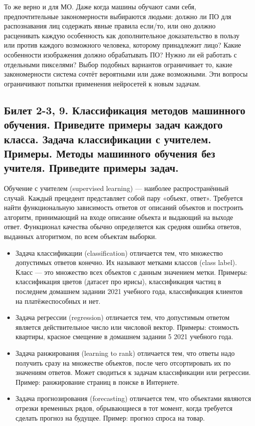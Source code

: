 \documentclass[a4paper, 12pt]{article}
\begin{document}
	То же верно и для МО. Даже когда машины обучают сами себя, предпочтительные закономерности выбираются людьми: должно ли ПО для распознавания лиц содержать явные правила если/то, или оно должно расценивать каждую особенность как дополнительное доказательство в пользу или против каждого возможного человека, которому принадлежит лицо? Какие особенности изображения должно обрабатывать ПО? Нужно ли ей работать с отдельными пикселями? Выбор подобных вариантов ограничивает то, какие закономерности система сочтёт вероятными или даже возможными. Эти вопросы ограничивают попытки применения нейросетей к новым задачам.

	\subsection*{Билет 2-3, 9. Классификация методов машинного обучения. Приведите примеры задач каждого класса. Задача классификации с учителем. Примеры. Методы машинного обучения без учителя. Приведите примеры задач.}
	Обучение с учителем (supervised learning) — наиболее распространённый случай. Каждый прецедент представляет собой пару «объект, ответ». Требуется найти функциональную зависимость ответов от описаний объектов и построить алгоритм, принимающий на входе описание объекта и выдающий на выходе ответ. Функционал качества обычно определяется как средняя ошибка ответов, выданных алгоритмом, по всем объектам выборки.
	\begin{itemize}
	\item Задача классификации (classification) отличается тем, что множество допустимых ответов конечно. Их называют метками классов (class label). Класс — это множество всех объектов с данным значением метки. Примеры: классификация цветов (датасет про ирисы), классификация частиц в последнем домашнем задании 2021 учебного года, классификация клиентов на платёжеспособных и нет.
	\item Задача регрессии (regression) отличается тем, что допустимым ответом является действительное число или числовой вектор. Примеры: стоимость квартиры, красное смещение в домашнем задании 5 2021 учебного года.
	\item Задача ранжирования (learning to rank) отличается тем, что ответы надо получить сразу на множестве объектов, после чего отсортировать их по значениям ответов. Может сводиться к задачам классификации или регрессии. Пример: ранжирование страниц в поиске в Интернете.
	\item Задача прогнозирования (forecasting) отличается тем, что объектами являются отрезки временных рядов, обрывающиеся в тот момент, когда требуется сделать прогноз на будущее. Пример: прогноз спроса на товар.
	\end{itemize}
\end{document}

